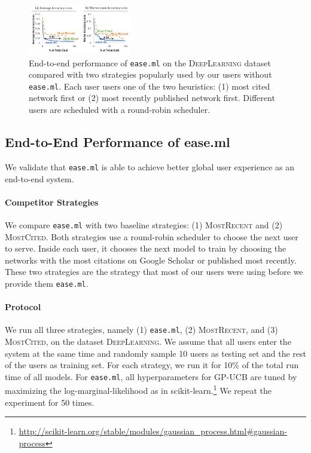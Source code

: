 \documentclass[letterpaper]{vldb}
\newcommand{\eml}{\texttt{ease.ml}\xspace}
\begin{document}
\begin{figure}[t!]
\centering
\includegraphics[width=0.4\textwidth]{figures/main}
\vspace{-1.5em}
\caption{End-to-end performance of
\texttt{ease.ml} on the
\textsc{DeepLearning} dataset
compared with two strategies
popularly used by our users 
without \texttt{ease.ml}. 
Each user users one of
the two heuristics:
(1) most cited network first or
(2) most recently published network first. 
Different users are
scheduled with a round-robin scheduler.}
\label{fig:end-to-end}
\vspace{-1em}
\end{figure}

\subsection{End-to-End Performance of ease.ml}

We validate that \eml is able to achieve
better global user experience as
an end-to-end system.

\vspace{-1em}
\paragraph*{Competitor Strategies}
We compare \eml with two baseline strategies:
(1) \textsc{MostRecent} and (2) \textsc{MostCited}.
Both strategies use a round-robin scheduler
to choose the next user to serve. Inside
each user, it chooses the next model to train
by choosing the networks with the
most citations on Google Scholar or
published most recently. These two strategies
are the strategy that most of our users
were using before we provide them \eml.

\vspace{-1em}
\paragraph*{Protocol} We run all
three strategies, namely (1) \eml,
(2) \textsc{MostRecent}, and (3) 
\textsc{MostCited}, on the 
dataset \textsc{DeepLearning}.
We assume that all users enter the system 
at the same time and randomly sample
10 users as testing set and the rest of the
users as training set. For each
strategy, we run it for 10\% of the
total run time of all models.
For \eml, all hyperparameters 
for GP-UCB are tuned by
maximizing the log-marginal-likelihood
as in scikit-learn.\footnote{\scriptsize
\url{http://scikit-learn.org/stable/modules/gaussian_process.html#gaussian-process}}
We repeat the experiment for 50 times. 
\end{document}
